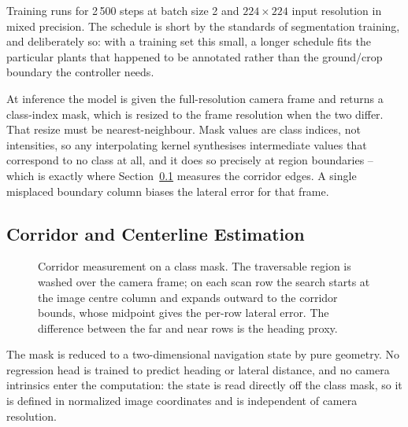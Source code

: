\documentclass[conference]{IEEEtran}
\begin{document}
Training runs for 2\,500 steps at batch size 2 and $224 \times 224$ input
resolution in mixed precision. The schedule is short by the standards of
segmentation training, and deliberately so: with a training set this small, a
longer schedule fits the particular plants that happened to be annotated rather
than the ground/crop boundary the controller needs.

At inference the model is given the full-resolution camera frame and returns a
class-index mask, which is resized to the frame resolution when the two differ.
That resize must be nearest-neighbour. Mask values are class indices, not
intensities, so any interpolating kernel synthesises intermediate values that
correspond to no class at all, and it does so precisely at region boundaries --
which is exactly where Section~\ref{sec:centerline} measures the corridor
edges. A single misplaced boundary column biases the lateral error for that
frame.

\subsection{Corridor and Centerline Estimation}
\label{sec:centerline}

\begin{figure}[t]
\centering
\caption{Corridor measurement on a class mask. The traversable region is washed
over the camera frame; on each scan row the search starts at the image centre
column and expands outward to the corridor bounds, whose midpoint gives the
per-row lateral error. The difference between the far and near rows is the
heading proxy.}
\label{fig:overlay}
\end{figure}

The mask is reduced to a two-dimensional navigation state by pure geometry.
No regression head is trained to predict heading or lateral distance, and no
camera intrinsics enter the computation: the state is read directly off the
class mask, so it is defined in normalized image coordinates and is
independent of camera resolution.
\end{document}
